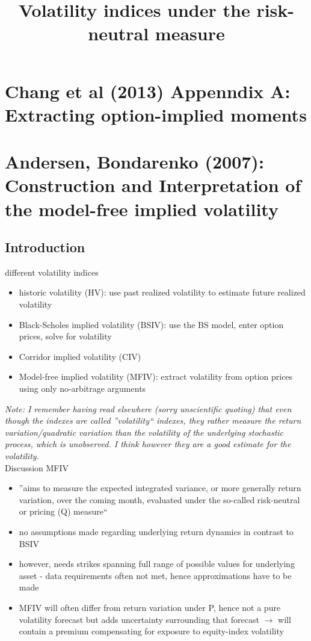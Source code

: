 \documentclass{article}
\title{Volatility indices under the risk-neutral measure}
\begin{document}
\maketitle

\section{Chang et al (2013) Appenndix A: Extracting option-implied moments}

\section{Andersen, Bondarenko (2007): Construction and Interpretation of the model-free implied volatility}

\subsection{Introduction}

different volatility indices
\begin{itemize}
    \item historic volatility (HV): use past realized volatility to estimate future realized volatility
    \item Black-Scholes implied volatility (BSIV): use the BS model, enter option prices, solve for volatility
    \item Corridor implied volatility (CIV) 
    \item Model-free implied volatility (MFIV): extract volatility from option prices using only no-arbitrage arguments 
\end{itemize}

\textit{Note: I remember having read elsewhere (sorry unscientific quoting) that even though the indexes are called ''volatility`` indexes, they rather measure the return variation/quadratic variation than the volatility of the underlying stochastic process, which is unobserved. I think however they are a good estimate for the volatility.}\\

Discussion MFIV
\begin{itemize}
\item ''aims to measure the expected integrated variance, or more generally return variation, over the coming month, evaluated under the so-called risk-neutral or pricing (Q) measure``
\item no assumptions made regarding underlying return dynamics in contrast to BSIV
\item however, needs strikes spanning full range of possible values for underlying asset - data requirements often not met, hence approximations have to be made
\item MFIV will often differ from return variation under P, hence not a pure volatility forecast but adds uncertainty surrounding that forecast $\rightarrow$ will contain a premium compensating for exposure to equity-index volatility
\end{itemize}
\end{document}
